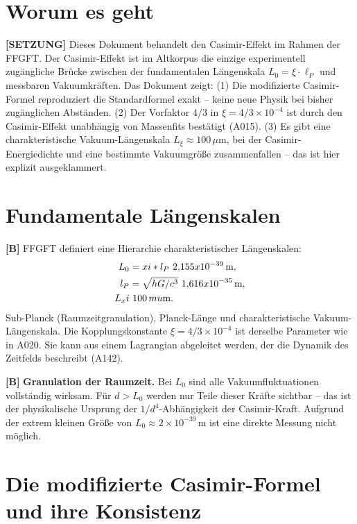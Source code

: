 \section{Worum es geht}

\textbf{[SETZUNG]} Dieses Dokument behandelt den Casimir-Effekt im Rahmen der FFGFT.
Der Casimir-Effekt ist im Altkorpus die einzige experimentell zugängliche Brücke
zwischen der fundamentalen Längenskala $L_0=\xi\cdot\ell_P$ und messbaren Vakuumkräften.
Das Dokument zeigt: (1) Die modifizierte Casimir-Formel reproduziert die Standardformel
exakt -- keine neue Physik bei bisher zugänglichen Abständen. (2) Der Vorfaktor $4/3$
in $\xi=4/3\times10^{-4}$ ist durch den Casimir-Effekt unabhängig von Massenfits
bestätigt (A015). (3) Es gibt eine charakteristische Vakuum-Längenskala
$L_\xi\approx100\,\mu\text{m}$, bei der Casimir-Energiedichte und eine bestimmte
Vakuumgröße zusammenfallen -- das ist hier explizit
ausgeklammert.

\section{Fundamentale Längenskalen}

\textbf{[B]} FFGFT definiert eine Hierarchie charakteristischer Längenskalen:
\begin{align}
  L_0    &= \xi\cdot\ell_P \approx 2{,}155\times10^{-39}\,\text{m}, \notag\\
  \ell_P &= \sqrt{\hbar G/c^3} \approx 1{,}616\times10^{-35}\,\text{m}, \notag\\
  L_\xi  &\approx 100\,\mu\text{m}. \notag
\end{align}
Sub-Planck (Raumzeitgranulation), Planck-Länge und charakteristische
Vakuum-Längenskala.
Die Kopplungskonstante $\xi=4/3\times10^{-4}$ ist derselbe Parameter wie in A020.
Sie kann aus einem Lagrangian abgeleitet werden, der die Dynamik des Zeitfelds
beschreibt (A142).

\textbf{[B]} \textbf{Granulation der Raumzeit.} Bei $L_0$ sind alle Vakuumfluktuationen
vollständig wirksam. Für $d>L_0$ werden nur Teile dieser Kräfte sichtbar -- das ist
der physikalische Ursprung der $1/d^4$-Abhängigkeit der Casimir-Kraft. Aufgrund der
extrem kleinen Größe von $L_0\approx2\times10^{-39}\,\text{m}$ ist eine direkte
Messung nicht möglich.

\section{Die modifizierte Casimir-Formel und ihre Konsistenz}

